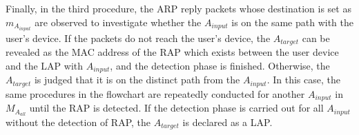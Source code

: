 \documentclass[conference]{IEEEtran}
\newcommand{\tarAP}{A_{target}}
\newcommand{\inputAP}{A_{input}}
\newcommand{\inputMAC}{m_{A_{input}}}
\begin{document}
Finally, in the third procedure, the ARP reply packets whose destination is set as $\inputMAC$ are observed to investigate whether the $\inputAP$ is on the same path with the user's device.
If the packets do not reach the user's device, the $\tarAP$ can be revealed as the MAC address of the RAP which exists between the user device and the LAP with  $\inputAP$, and the detection phase is finished.
Otherwise, the $\tarAP$ is judged that it is on the distinct path from the $\inputAP$.
In this case, the same procedures in the flowchart are repeatedly conducted for another $\inputAP$ in $M_{A_{all}}$ until the RAP is detected.
If the detection phase is carried out for all $\inputAP$ without the detection of RAP, the $\tarAP$ is declared as a LAP. 
\end{document}
